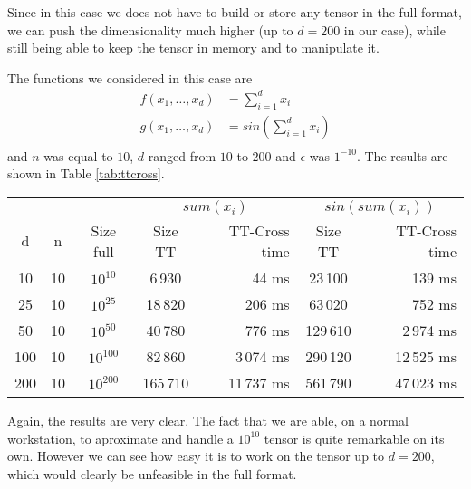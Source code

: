 Since in this case we does not have to build or store any tensor in the full format, we can push the dimensionality much higher (up to $d = 200$ in our case), while still being able to keep the tensor in memory and to manipulate it.

The functions we considered in this case are
\begin{align*}
  f(x_1,\ldots,x_d) &= \sum_{i=1}^{d} x_i\\
  g(x_1,\ldots,x_d) &= sin(\sum_{i=1}^{d} x_i)\\
\end{align*}
and $n$ was equal to $10$, $d$ ranged from $10$ to $200$ and $\epsilon$ was $1^{-10}$.
The results are shown in Table \ref{tab:ttcross}.

\begin{center}
  \begin{tabular}[ht!]{ccccrcr}
    \toprule
      &    &           & \multicolumn{2}{c}{$sum(x_i)$} & \multicolumn{2}{c}{$sin(sum(x_i))$}\\
    d & n  & Size full & Size TT & TT-Cross time & Size TT & TT-Cross time\\ \midrule
    10  &10   &$10^{10}$      &6\,930     & 44 ms    &23\,100    & 139 ms\\
    25  &10   &$10^{25}$      &18\,820    & 206 ms    &63\,020    & 752 ms\\
    50  &10   &$10^{50}$      &40\,780    & 776 ms    &129\,610   &2\,974 ms\\
    100 &10   &$10^{100}$     &82\,860    &3\,074 ms    &290\,120   &12\,525 ms\\
    200 &10   &$10^{200}$     &165\,710   &11\,737 ms    &561\,790   &47\,023 ms\\ \bottomrule
  \end{tabular}
\end{center}

Again, the results are very clear.
The fact that we are able, on a normal workstation, to aproximate and handle a $10^{10}$ tensor is quite remarkable on its own. However we can see how easy it is to work on the tensor up to $d = 200$, which would clearly be unfeasible in the full format.

